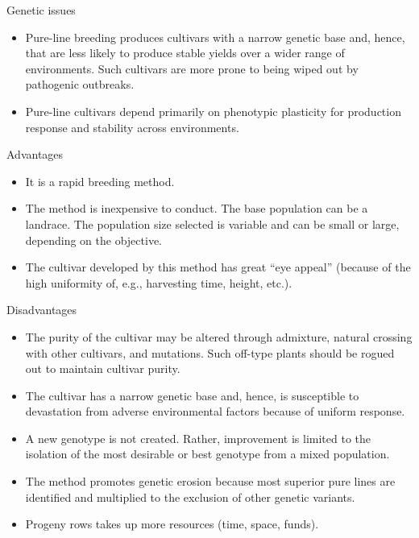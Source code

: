 \documentclass[11pt,dvipsnames,ignorenonframetext,aspectratio=169]{beamer}
\providecommand{\tightlist}{%
  \setlength{\itemsep}{0pt}\setlength{\parskip}{0pt}}
\begin{document}
\begin{frame}{Genetic issues}
\protect\hypertarget{genetic-issues}{}

\begin{itemize}
\tightlist
\item
  Pure-line breeding produces cultivars with a narrow genetic base and,
  hence, that are less likely to produce stable yields over a wider
  range of environments. Such cultivars are more prone to being wiped
  out by pathogenic outbreaks.
\item
  Pure-line cultivars depend primarily on phenotypic plasticity for
  production response and stability across environments.
\end{itemize}

\end{frame}

\begin{frame}{Advantages}
\protect\hypertarget{advantages}{}

\begin{itemize}
\tightlist
\item
  It is a rapid breeding method.
\item
  The method is inexpensive to conduct. The base population can be a
  landrace. The population size selected is variable and can be small or
  large, depending on the objective.
\item
  The cultivar developed by this method has great ``eye appeal''
  (because of the high uniformity of, e.g., harvesting time, height,
  etc.).
\end{itemize}

\end{frame}

\begin{frame}{Disadvantages}
\protect\hypertarget{disadvantages}{}

\begin{itemize}
\tightlist
\item
  The purity of the cultivar may be altered through admixture, natural
  crossing with other cultivars, and mutations. Such off-type plants
  should be rogued out to maintain cultivar purity.
\item
  The cultivar has a narrow genetic base and, hence, is susceptible to
  devastation from adverse environmental factors because of uniform
  response.
\item
  A new genotype is not created. Rather, improvement is limited to the
  isolation of the most desirable or best genotype from a mixed
  population.
\item
  The method promotes genetic erosion because most superior pure lines
  are identified and multiplied to the exclusion of other genetic
  variants.
\item
  Progeny rows takes up more resources (time, space, funds).
\end{itemize}

\end{frame}
\end{document}
